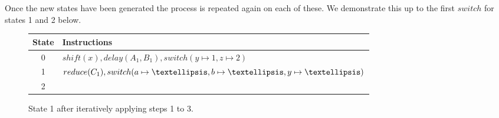 \documentclass[envcountsame,runningheads]{llncs}
\begin{document}
\clearpage
Once the new states have been generated the process is repeated again on each of these. We demonstrate this up to the first $switch$ for states 1 and 2 below.

\begin{figure}[!ht]
\centering
{}

\vspace{.5\baselineskip}
\small{\begin{tabular}{|c|l|}
  \hline
  \textbf{State} & \textbf{Instructions} \\
  \hline
  0 & $shift(x), delay(A_1, B_1), switch(y \mapsto 1, z \mapsto 2)$ \\
  1 & $reduce(C_1), switch(a \mapsto \textellipsis, b \mapsto \textellipsis, y \mapsto \textellipsis)$ \\ 
  2 & $ $ \\  
  \hline
\end{tabular}}
\caption{State 1 after iteratively applying steps 1 to 3.}
\end{figure}
\end{document}
